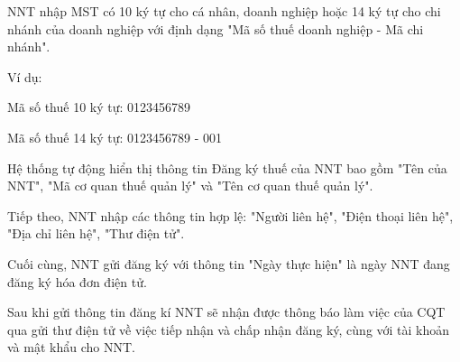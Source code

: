 
NNT nhập MST có 10 ký tự cho cá nhân, doanh nghiệp hoặc 14 ký tự cho chi nhánh của doanh nghiệp với định dạng "Mã số thuế doanh nghiệp - Mã chi nhánh".

Ví dụ:

Mã số thuế 10 ký tự: 0123456789

Mã số thuế 14 ký tự: 0123456789 - 001

Hệ thống tự động hiển thị thông tin Đăng ký thuế của NNT bao gồm "Tên của NNT", "Mã cơ quan thuế quản lý" và "Tên cơ quan thuế quản lý".

Tiếp theo, NNT nhập các thông tin hợp lệ: "Người liên hệ", "Điện thoại liên hệ", "Địa chỉ liên hệ", "Thư điện tử".

Cuối cùng, NNT gửi đăng ký với thông tin "Ngày thực hiện" là ngày NNT đang đăng ký hóa đơn điện tử.

Sau khi gửi thông tin đăng kí NNT sẽ nhận được thông báo làm việc của CQT qua gửi thư điện tử về việc tiếp nhận và chấp nhận đăng ký, cùng với tài khoản và mật khẩu cho NNT.










